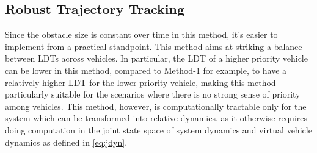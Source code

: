 \subsection{Robust Trajectory Tracking}
Since the obstacle size is constant over time in this method, it's easier to implement from a practical standpoint. This method aims at striking a balance between LDTs across vehicles. In particular, the LDT of a higher priority vehicle can be lower in this method, compared to Method-1 for example, to have a relatively higher LDT for the lower priority vehicle, making this method particularly suitable for the scenarios where there is no strong sense of priority among vehicles. This method, however, is computationally tractable only for the system which can be transformed into relative dynamics, as it otherwise requires doing computation in the joint state space of system dynamics and virtual vehicle dynamics as defined in \ref{eq:jdyn}. 